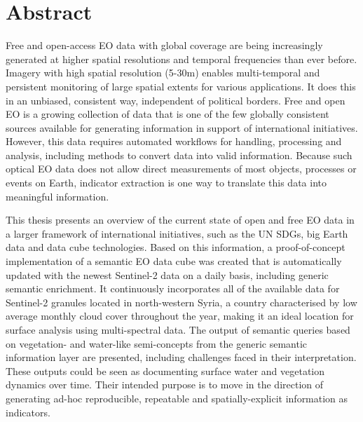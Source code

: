 \cleardoublepage
{}
\begingroup
\let\cleardoublepage\relax
\let\cleardoublepage\relax

\chapter*{Abstract}

Free and open-access \acf{EO} data with global coverage are being increasingly generated at higher spatial resolutions and temporal frequencies than ever before. Imagery with high spatial resolution (5-30\acs{m}) enables multi-temporal and persistent monitoring of large spatial extents for various applications. It does this in an unbiased, consistent way, independent of political borders. Free and open \acs{EO} is a growing collection of data that is one of the few globally consistent sources available for generating information in support of international initiatives. However, this data requires automated workflows for handling, processing and analysis, including methods to convert data into valid information. Because such optical \acs{EO} data does not allow direct measurements of most objects, processes or events on Earth, indicator extraction is one way to translate this data into meaningful information.

This thesis presents an overview of the current state of open and free \acs{EO} data in a larger framework of international initiatives, such as the \acs{UN} \acp{SDG}, big Earth data and data cube technologies. Based on this information, a proof-of-concept implementation of a semantic \acs{EO} data cube was created that is automatically updated with the newest Sentinel-2 data on a daily basis, including generic semantic enrichment. It continuously incorporates all of the available data for Sentinel-2 granules located in north-western Syria, a country characterised by low average monthly cloud cover throughout the year, making it an ideal location for surface analysis using multi-spectral data. The output of semantic queries based on vegetation- and water-like semi-concepts from the generic semantic information layer are presented, including challenges faced in their interpretation. These outputs could be seen as documenting surface water and vegetation dynamics over time. Their intended purpose is to move in the direction of generating ad-hoc reproducible, repeatable and spatially-explicit information as indicators.

